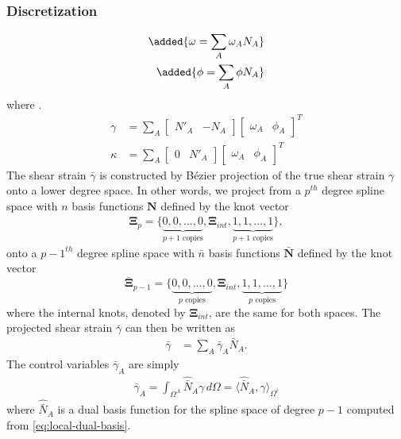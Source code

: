 \documentclass{article}
\begin{document}
\subsubsection{Discretization}
\begin{align}
  \added{\omega = \sum_A \omega_A N_A} \\
  \added{\phi = \sum_A \phi N_A}
\end{align}
where . 
{\color{blue}\begin{align}
\gamma &= \sum_A{\begin{bmatrix}N'_A & -N_A\end{bmatrix}\begin{bmatrix}\omega_A & \phi_A\end{bmatrix}^T} \\
\kappa &= \sum_A\begin{bmatrix}0 & N'_A\end{bmatrix}\begin{bmatrix}\omega_A & \phi_A\end{bmatrix}^T
\end{align}}
The shear strain $\bar{\gamma}$ is constructed by B\'{e}zier projection of the true shear strain $\gamma$ onto a lower degree space. In other words, we project from a $p^{th}$ degree spline space with $n$ basis functions $\mathbf{N}$ defined by the knot vector
\begin{align}
\mathbf{\Xi}_{p}=\lbrace{\underbrace{0,0,\ldots,0}_\text{$p+1$ copies}},\mathbf{\Xi}_{int},{\underbrace{1,1,\ldots,1}_\text{$p+1$ copies}}\rbrace,
\label{eq:origin_knot_vector}
\end{align}
onto a $p-1^{th}$ degree spline space with $\bar{n}$ basis functions $\bar{\mathbf{N}}$ defined by the knot vector
\begin{equation}
\bar{\mathbf{\Xi}}_{p-1}=\lbrace{\underbrace{0,0,\ldots,0}_\text{$p$ copies}},\mathbf{\Xi}_{int},{\underbrace{1,1,\ldots,1}_\text{$p$ copies}}\rbrace
\label{eq:projected_knot_vector}
\end{equation}
where the internal knots, denoted by $\mathbf{\Xi}_{int}$, are the same for both spaces. The projected shear strain $\bar{\gamma}$ can then be written as
\begin{align}
  \bar{\gamma} &= \sum_A \bar{\gamma}_A \bar{N}_A.
\end{align}
The control variables $\bar{\gamma}_A$ are simply
\begin{align}
  \bar{\gamma}_A = \int_{\Omega^A} \hat{\bar{N}}_A \gamma \, d\Omega = \langle \hat{\bar{N}}_A, \gamma \rangle_{\Omega^i}
\end{align}
where $\hat{\bar{N}}_A$ is a dual basis function for the spline space of degree $p-1$ computed from \eqref{eq:local-dual-basis}.
\end{document}
